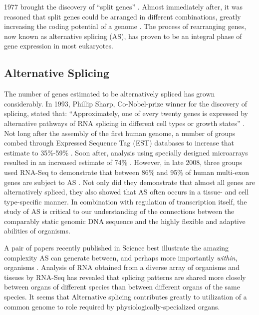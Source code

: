  1977 brought the discovery of ``split genes'' \citep{Berget1977a,Chow1977}. Almost immediately after, it was reasoned that split genes could be arranged in different combinations, greatly increasing the coding potential of a genome \citep{Gilbert1978a}. The process of rearranging genes, now known as alternative splicing (AS), has proven to be an integral phase of gene expression in most eukaryotes. 

  \subsection{Alternative Splicing}\label{Intro:subsec:Alternative Splicing}

    The number of genes estimated to be alternatively spliced has grown considerably. In 1993, Phillip Sharp, Co-Nobel-prize winner for the discovery of splicing, stated that: ``Approximately, one of every twenty genes is expressed by alternative pathways of RNA splicing in different cell types or growth states'' \cite{Sharp2014}. Not long after the assembly of the first human genome, a number of groups combed through Expressed Sequence Tag (EST) databases to increase that estimate to 35\%-59\% \citep{Modrek2002}. Soon after, analysis using specially designed microarrays resulted in an increased estimate of 74\% \citep{Johnson2003}. However, in late 2008, three groups used RNA-Seq to demonstrate that between 86\% and 95\% of human multi-exon genes are subject to AS \citep{Pan2008, Wang2008, Sultan2008}. Not only did they demonstrate that almost all genes are alternatively spliced, they also showed that AS often occurs in a tissue- and cell type-specific manner. In combination with regulation of transcription itself, the study of AS is critical to our understanding of the connections between the comparably static genomic DNA sequence and the highly flexible and adaptive abilities of organisms.

    A pair of papers recently published in Science best illustrate the amazing complexity AS can generate between, and perhaps more importantly \textit{within}, organisms \citep{Barbosa-Morais2012,Merkin2012}. Analysis of RNA obtained from a diverse array of organisms and tissues by RNA-Seq has revealed that splicing patterns are shared more closely between organs of different species than between different organs of the same species. It seems that Alternative splicing contributes greatly to utilization of a common genome to role required by physiologically-specialized organs. 


